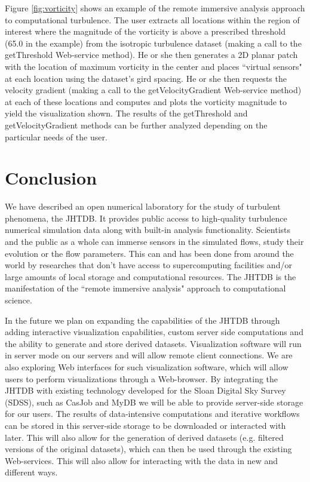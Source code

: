 \documentclass[10pt,twocolumn]{article}
\begin{document}
Figure \ref{fig:vorticity} shows an example of the remote immersive analysis approach to computational turbulence. The user extracts all locations within the
region of interest where the magnitude of the vorticity is above a prescribed threshold (65.0 in the example) from the isotropic turbulence dataset (making 
a call to the getThreshold Web-service method). He or she then generates a 2D planar patch with the location of maximum vorticity in the center and places
``virtual sensors" at each location using the dataset's gird spacing. He or she then requests the velocity gradient (making a call to the getVelocityGradient
Web-service method) at each of these locations and computes and plots the vorticity magnitude to yield the visualization shown. The results of the 
getThreshold and getVelocityGradient methods can be further analyzed depending on the particular needs of the user.

\section{Conclusion}
We have described an open numerical laboratory for the study of turbulent phenomena, the JHTDB. It provides public access to high-quality turbulence 
numerical simulation data along with built-in analysis functionality. Scientists and the public as a whole can immerse sensors in the simulated flows, study
their evolution or the flow parameters. This can and has been done from around the world by researches that don't have access to supercomputing facilities
and/or large amounts of local storage and computational resources. The JHTDB is the manifestation of the ``remote immersive analysis" approach to 
computational science.

In the future we plan on expanding the capabilities of the JHTDB through adding interactive visualization capabilities, custom server side computations and
the ability	to generate and store derived datasets. Visualization software will run in server
mode on our servers and will allow remote client connections. We are also exploring Web interfaces for such visualization software, which will allow users
to perform visualizations through a Web-browser. By integrating the JHTDB with existing technology developed for the Sloan Digital Sky Survey (SDSS), such
as CasJob and MyDB \cite{LiThakar} we will be able to provide server-side storage for our users. The results of data-intensive computations and iterative 
workflows can be stored in this server-side storage to be downloaded or interacted with later. This will also allow for the generation of derived datasets (e.g.
filtered versions of the original datasets), which can then be used through the existing Web-services. This will also allow for interacting with the data in new
and different ways.

\vfill
\newpage
 

\vfill

\newpage
   
 
\end{document}
